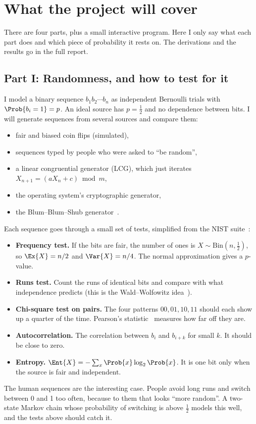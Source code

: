 \section{What the project will cover}\label{sec:scope}

There are four parts, plus a small interactive program. Here I only say what
each part does and which piece of probability it rests on. The derivations
and the results go in the full report.

\subsection{Part I: Randomness, and how to test for it}

I model a binary sequence $b_1 b_2 \cdots b_n$ as independent Bernoulli
trials with $\Prob{b_i = 1} = p$. An ideal source has $p = \tfrac12$ and no
dependence between bits. I will generate sequences from several sources and
compare them:
\begin{itemize}
  \item fair and biased coin flips (simulated),
  \item sequences typed by people who were asked to ``be random'',
  \item a linear congruential generator (LCG), which just iterates
        $X_{n+1} = (aX_n + c) \bmod m$,
  \item the operating system's cryptographic generator,
  \item the Blum--Blum--Shub generator~\cite{blum1986}.
\end{itemize}
Each sequence goes through a small set of tests, simplified from the NIST
suite~\cite{nistsp80022}:
\begin{itemize}
  \item \textbf{Frequency test.} If the bits are fair, the number of ones is
        $X \sim \mathrm{Bin}(n, \tfrac12)$, so $\Ex{X} = n/2$ and
        $\Var{X} = n/4$. The normal approximation gives a $p$-value.
  \item \textbf{Runs test.} Count the runs of identical bits and compare with
        what independence predicts (this is the Wald--Wolfowitz
        idea~\cite{wald1940}).
  \item \textbf{Chi-square test on pairs.} The four patterns $00, 01, 10, 11$
        should each show up a quarter of the time. Pearson's
        statistic~\cite{pearson1900} measures how far off they are.
  \item \textbf{Autocorrelation.} The correlation between $b_i$ and
        $b_{i+k}$ for small $k$. It should be close to zero.
  \item \textbf{Entropy.} $\Ent{X} = -\sum_x \Prob{x}\log_2\Prob{x}$. It is
        one bit only when the source is fair and independent.
\end{itemize}
The human sequences are the interesting case. People avoid long runs and
switch between 0 and 1 too often, because to them that looks ``more random''.
A two-state Markov chain whose probability of switching is above $\tfrac12$
models this well, and the tests above should catch it.

